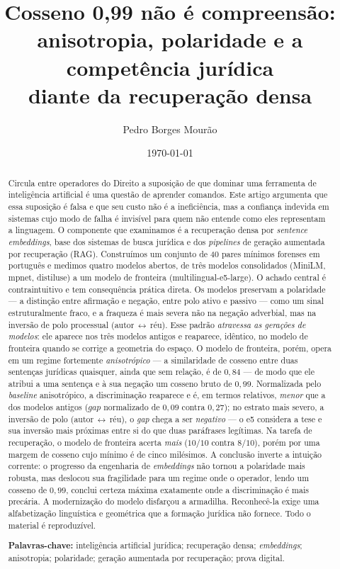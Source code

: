 \documentclass[11pt]{article}
\title{\textbf{Cosseno 0,99 não é compreensão:\\
\large anisotropia, polaridade e a competência jurídica\\
diante da recuperação densa}}
\author[ ]{Pedro Borges Mourão}
\affil[ ]{\small Promotor de Justiça, Mestre em Direito, Especialista em Segurança da Informação\\
e pesquisador na interseção entre Direito, inteligência artificial e forense digital.}
\date{\today}
\begin{document}
\maketitle

\begin{abstract}
\noindent
Circula entre operadores do Direito a suposição de que dominar uma ferramenta de
inteligência artificial é uma questão de aprender comandos. Este artigo argumenta
que essa suposição é falsa e que seu custo não é a ineficiência, mas a confiança
indevida em sistemas cujo modo de falha é invisível para quem não entende como
eles representam a linguagem. O componente que examinamos é a recuperação densa
por \textit{sentence embeddings}, base dos sistemas de busca jurídica e dos
\textit{pipelines} de geração aumentada por recuperação (RAG). Construímos um
conjunto de 40 pares mínimos forenses em português e medimos quatro modelos
abertos, de três modelos consolidados (MiniLM, mpnet, distiluse) a um modelo de
fronteira (multilingual-e5-large). O achado central é contraintuitivo e tem
consequência prática direta. Os modelos preservam a polaridade --- a distinção
entre afirmação e negação, entre polo ativo e passivo --- como um sinal
estruturalmente fraco, e a fraqueza é mais severa não na negação adverbial, mas
na inversão de polo processual (autor\,$\leftrightarrow$\,réu). Esse padrão
\emph{atravessa as gerações de modelos}: ele aparece nos três modelos antigos e
reaparece, idêntico, no modelo de fronteira quando se corrige a geometria do
espaço. O modelo de fronteira, porém, opera em um regime fortemente
\emph{anisotrópico} --- a similaridade de cosseno entre duas sentenças jurídicas
quaisquer, ainda que sem relação, é de $0{,}84$ --- de modo que ele atribui a uma
sentença e à sua negação um cosseno bruto de $0{,}99$. Normalizada pelo
\textit{baseline} anisotrópico, a discriminação reaparece e é, em termos
relativos, \emph{menor} que a dos modelos antigos ($\textit{gap}$ normalizado de
$0{,}09$ contra $0{,}27$); no estrato mais severo, a inversão de polo
(autor\,$\leftrightarrow$\,réu), o \textit{gap} chega a ser \emph{negativo} --- o
e5 considera a tese e sua inversão mais próximas entre si do que duas paráfrases
legítimas. Na tarefa de recuperação, o modelo de fronteira acerta
\emph{mais} ($10/10$ contra $8/10$), porém por uma margem de cosseno cujo mínimo
é de cinco milésimos. A conclusão inverte a intuição corrente: o progresso da
engenharia de \textit{embeddings} não tornou a polaridade mais robusta, mas
deslocou sua fragilidade para um regime onde o operador, lendo um cosseno de
$0{,}99$, conclui certeza máxima exatamente onde a discriminação é mais precária.
A modernização do modelo disfarçou a armadilha. Reconhecê-la exige uma
alfabetização linguística e geométrica que a formação jurídica não fornece. Todo
o material é reproduzível.

\vspace{0.6em}
\noindent\textbf{Palavras-chave:} inteligência artificial jurídica; recuperação
densa; \textit{embeddings}; anisotropia; polaridade; geração aumentada por
recuperação; prova digital.
\end{abstract}
\end{document}
